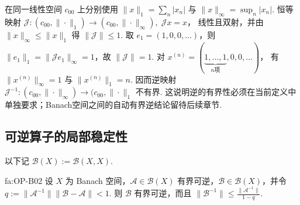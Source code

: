 \begin{FACounterexample}[有界线性双射的逆未必有界]\label{i05:bounded-bijection-unbounded-inverse}
在同一线性空间 \(\displaystyle c_{00}\) 上分别使用 \(\displaystyle \|x\|_1=\sum_n|x_n|\) 与 \(\displaystyle \|x\|_\infty=\sup_n|x_n|\). 恒等映射 \(\displaystyle \mathcal J:(c_{00},\|\cdot\|_1)\to(c_{00},\|\cdot\|_\infty),\; \mathcal Jx=x\)，
线性且双射，并由 \(\displaystyle \|x\|_\infty\leqslant\|x\|_1\) 得 \(\displaystyle \|\mathcal J\|\leqslant1\). 取 \(\displaystyle e_1=(1,0,0,\dots)\)，则 \(\displaystyle \|e_1\|_1=\|\mathcal Je_1\|_\infty=1\)，故 \(\displaystyle \|\mathcal J\|=1\). 对 \(\displaystyle x^{(n)}=(\underbrace{1,\dots,1}_{n\text{项}},0,0,\dots)\)，
有 \(\displaystyle \|x^{(n)}\|_\infty=1\) 与 \(\displaystyle \|x^{(n)}\|_1=n\). 因而逆映射 \(\displaystyle \mathcal J^{-1}:(c_{00},\|\cdot\|_\infty)\to(c_{00},\|\cdot\|_1\) 不有界. 这说明逆的有界性必须在当前定义中单独要求；Banach空间之间的自动有界逆结论留待后续章节.
\end{FACounterexample}

\subsection{可逆算子的局部稳定性}

以下记 \(\displaystyle \mathcal B(X):=\mathcal B(X,X)\).

\begin{FATheorem}[B][可逆算子集合局部稳定性]{fa:OP-B02}
设 \(\displaystyle X\) 为 Banach 空间，\(\displaystyle \mathcal A\in\mathcal B(X)\) 有界可逆，\(\displaystyle \mathcal B\in\mathcal B(X)\)，并令 \(\displaystyle q:=\|\mathcal A^{-1}\|\|\mathcal B-\mathcal A\|<1\).
则 \(\displaystyle \mathcal B\) 有界可逆，而且 \(\displaystyle \|\mathcal B^{-1}\| \leqslant \frac{\|\mathcal A^{-1}\|}{1-q}\).
\end{FATheorem}

